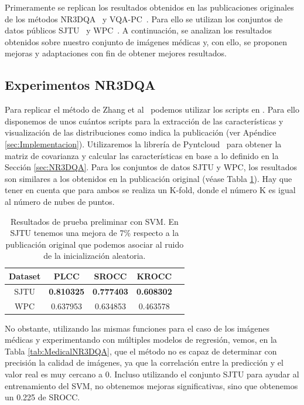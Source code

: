 Primeramente se replican los resultados obtenidos en las publicaciones originales 
de los métodos NR3DQA~\cite{NR3DQA} y VQA-PC~\cite{VQA-PC}. Para ello se utilizan
los conjuntos de datos públicos SJTU~\cite{SJTU} y WPC~\cite{WPC1,WPC2}. 
A continuación, se analizan los resultados obtenidos sobre nuestro conjunto 
de imágenes médicas y, con ello, se proponen mejoras y adaptaciones con fin 
de obtener mejores resultados. 

\subsection{Experimentos NR3DQA}
Para replicar el método de Zhang et al~\cite{NR3DQA} podemos utilizar los 
scripts en . Para ello disponemos de unos cuántos scripts para la extracción de las características y visualización de las distribuciones 
como indica la publicación (ver Apéndice \ref{sec:Implementacion}). 
Utilizaremos la librería de Pyntcloud~\cite{Pyntcloud} para obtener 
la matriz de covarianza y calcular las características en base a lo definido 
en la Sección \ref{sec:NR3DQA}.
Para los conjuntos de datos SJTU y WPC, los resultados 
son similares a los obtenidos en la publicación original (véase Tabla \ref{tab:PlainNR3DQA}).
Hay que tener en cuenta que para ambos se realiza un K-fold, donde el número 
K es igual al número de nubes de puntos.

\begin{table}[htp]
  \scriptsize
  \begin{center}
    \begin{tabular}[c]{|c|c|c|c|c|}
      \hline
      \rowcolor[HTML]{FFC702}
      \textbf{Dataset} & \textbf{PLCC} & \textbf{SROCC} & \textbf{KROCC} \\ 
      \hline
      SJTU & \textbf{0.810325} & \textbf{0.777403} & \textbf{0.608302} \\ 
      \hline 
      WPC & 0.637953 & 0.634853 & 0.463578 \\
      \hline
    \end{tabular}
  \end{center}
  \caption[Resultados de prueba preliminar con SVM.]{Resultados de prueba preliminar con SVM.
  En SJTU tenemos una mejora de 7\% respecto a la publicación original que podemos asociar al ruido de la inicialización aleatoria. }
  \label{tab:PlainNR3DQA}
\end{table}

No obstante, utilizando las mismas funciones para el caso de los imágenes médicas 
y experimentando con múltiples modelos de regresión, 
vemos, en la Tabla \ref{tab:MedicalNR3DQA}, que el método no es capaz
de determinar con precisión la calidad de imágenes, ya que la correlación entre 
la predicción y el valor real es muy cercano a 0. 
Incluso utilizando el conjunto SJTU para ayudar al entrenamiento 
del SVM, no obtenemos mejoras significativas, sino que obtenemos un 0.225 de SROCC.


